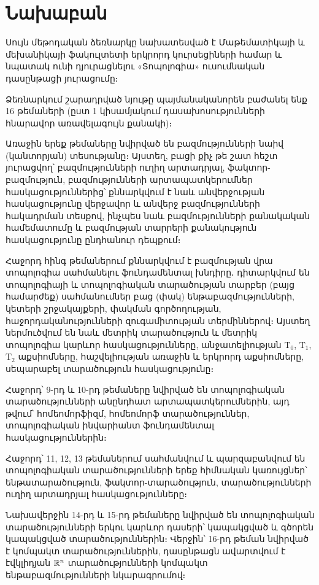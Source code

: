 \documentclass[./main.tex]{subfiles}
\begin{document}
\onehalfspacing
\section*{Նախաբան}\label{sec:intro}
\par Սույն մեթոդական ձեռնարկը նախատեսված է Մաթեմատիկայի և մեխանիկայի ֆակուլտետի երկրորդ կուրսեցիների համար և նպատակ ունի դյուրացնելու «Տոպո\-լոգիա» ուսումնական դասընթացի յուրացումը։
\par Ձեռնարկում շարադրված նյութը պայմանականորեն բաժանել ենք 16 թեմաների (ըստ 1 կիսամյակում դասախոսությունների հնարավոր առավելագույն քանակի)։
\par Առաջին երեք թեմաները նվիրված են բազմությունների նաիվ (կանտորյան) տեսությանը։ Այստեղ, բացի քիչ թե շատ հեշտ յուրացվող՝ բազմությունների ուղիղ արտադրյալ, ֆակտոր-բազմություն, բազմությունների արտապատկերումներ հաս\-կա\-ցու\-թյուն\-ներից՝ քննարկվում է նաև անվերջության հասկացությունը վերջավոր և անվերջ բազմությունների հակադրման տեսքով, ինչպես նաև բազմությունների քանակական համեմատումը և բազմության տարրերի քանակություն հասկացու\-թյունը ընդհանուր դեպքում։
\par Հաջորդ հինգ թեմաներում քննարկվում է բազմության վրա տոպոլոգիա սահմա\-նե\-լու ֆունդամենտալ խնդիրը․ դիտարկվում են տոպոլոգիայի և տոպոլոգիական տա\-րա\-ծու\-թյան տարբեր (բայց համարժեք) սահմանումներ բաց (փակ) ենթա\-բազմու\-թյուն\-ների, կետերի շրջակայքերի, փակման գործողության, հաջորդականություն\-ների զուգամիտության տերմիններով։ Այստեղ ներմուծվում են նաև մետրիկ տարա\-ծու\-թյուն և մետրիկ տոպոլոգիա կարևոր հասկացությունները, անջատելի\-ու\-թյան $\textrm{T}_0$, $\textrm{T}_1$, $\textrm{T}_2$ աքսիոմները, հաշվելիության առաջին և երկրորդ աքսիոմները, սեպա\-րա\-բել տա\-րա\-ծու\-թյուն հասկացությունը։
\par Հաջորդ՝ 9-րդ և 10-րդ թեմաները նվիրված են տոպոլոգիական տարածու\-թյուն\-ների անընդհատ արտապատկերումներին, այդ թվում՝ հոմեոմորֆիզմ, հոմեոմորֆ տարածություններ, տոպոլոգիական ինվարիանտ ֆունդամենտալ հասկացու\-թյուն\-ներին։
\par Հաջորդ՝ 11, 12, 13 թեմաներում սահմանվում և պարզաբանվում են տոպո\-լոգիա\-կան տարածությունների երեք հիմնական կառույցներ՝ ենթատարածություն, ֆակ\-տոր-տարածություն, տարածությունների ուղիղ արտադրյալ հասկացությունները։
\par Նախավերջին 14-րդ և 15-րդ թեմաները նվիրված են տոպոլոգիական տարածու\-թյուն\-ների երկու կարևոր դասերի՝ կապակցված և գծորեն կապակցված տարածու\-թյուն\-ներին։ Վերջին՝ 16-րդ թեման նվիրված է կոմպակտ տարածություններին, դաս\-ընթացն ավարտվում է էվկլիդյան $\mathbb{R}^n$ տարածությունների կոմպակտ ենթա\-բազմու\-թյուն\-ների նկարագրումով։
\end{document}
